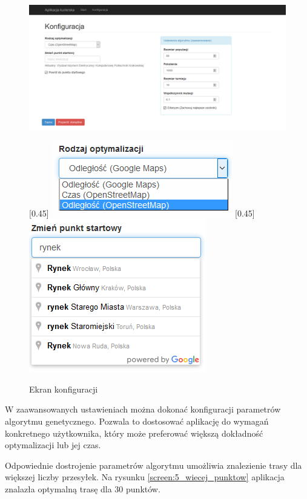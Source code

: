 \begin{figure}
	\centering
	{\includegraphics[width=\linewidth]{screen/3_konfiguracja}}
	
	\bigskip
	
	[0.45\linewidth]
	{\includegraphics[width=0.4\linewidth]{screen/4a_konfiguracja_cel}}\hfill
	[0.45\linewidth]
	{\includegraphics[width=0.4\linewidth]{screen/4b_konfiguracja_start}}
	
	\caption{Ekran konfiguracji}
\end{figure}

\clearpage

W zaawansowanych ustawieniach można dokonać konfiguracji parametrów algorytmu genetycznego. Pozwala to dostosować aplikację do wymagań konkretnego użytkownika, który może preferować większą dokładność optymalizacji lub jej czas.

Odpowiednie dostrojenie parametrów algorytmu umożliwia znalezienie trasy dla większej liczby przesyłek. Na rysunku \ref{screen:5_wiecej_punktow} aplikacja znalazła optymalną trasę dla 30 punktów.

